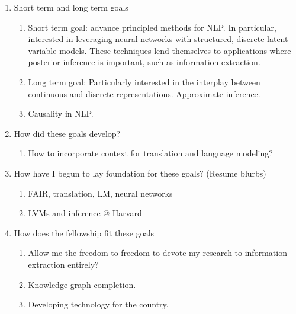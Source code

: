 \documentclass[11pt]{article}
\begin{document}
\begin{enumerate}
\item Short term and long term goals
    \begin{enumerate}
    \item Short term goal: advance principled methods for NLP.
        In particular, interested in leveraging neural networks with
        structured, discrete latent variable models.
        These techniques lend themselves to applications where posterior
        inference is important, such as information extraction.
    \item Long term goal: 
        Particularly interested in the interplay between continuous and
        discrete representations.
        Approximate inference.
    \item Causality in NLP.
    \end{enumerate}
\item How did these goals develop?
    \begin{enumerate}
    \item How to incorporate context for translation and language modeling?
    \end{enumerate}
\item How have I begun to lay foundation for these goals? (Resume blurbs)
    \begin{enumerate}
    \item FAIR, translation, LM, neural networks
    \item LVMs and inference @ Harvard
    \end{enumerate}
\item How does the fellowship fit these goals
    \begin{enumerate}
    \item Allow me the freedom to freedom to devote my research to information extraction entirely?
    \item Knowledge graph completion.
    \item Developing technology for the country.
    \end{enumerate}
\end{enumerate}



\end{document}
